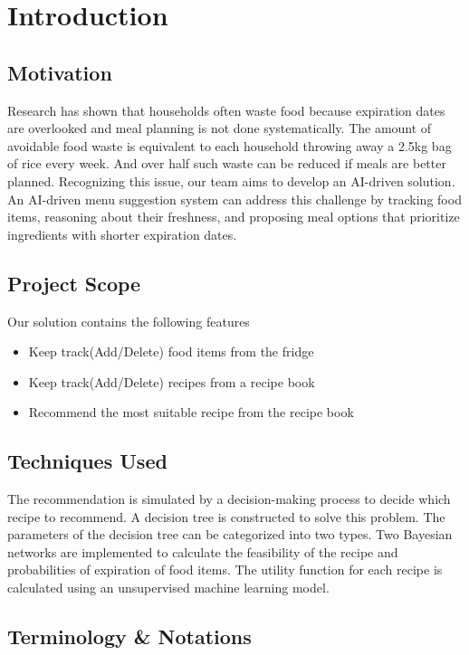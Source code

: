 \section{Introduction}
\subsection{Motivation}
Research has shown that households often waste food because expiration dates are overlooked and meal planning is not done systematically. The amount of avoidable food waste is equivalent to each household throwing away a 2.5kg bag of rice every week. And over half such waste can be reduced if meals are better planned. Recognizing this issue, our team aims to develop an AI-driven solution. An AI-driven menu suggestion system can address this challenge by tracking food items, reasoning about their freshness, and proposing meal options that prioritize ingredients with shorter expiration dates.

\subsection{Project Scope}
Our solution contains the following features
\begin{itemize}
    \item Keep track(Add/Delete) food items from the fridge
    \item Keep track(Add/Delete) recipes from a recipe book
    \item Recommend the most suitable recipe from the recipe book
\end{itemize}

\subsection{Techniques Used}
The recommendation is simulated by a decision-making process to decide which recipe to recommend. A decision tree is constructed to solve this problem. The parameters of the decision tree can be categorized into two types. Two Bayesian networks are implemented to calculate the feasibility of the recipe and probabilities of expiration of food items. The utility function for each recipe is calculated using an unsupervised machine learning model.

\subsection{Terminology \& Notations}

